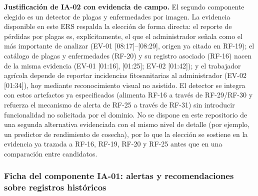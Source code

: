 \documentclass[12pt,a4paper]{article}
\begin{document}
\textbf{Justificación de IA-02 con evidencia de campo.} El segundo componente elegido es un detector de plagas y enfermedades por imagen. La evidencia disponible en este ERS respalda la elección de forma directa: el reporte de pérdidas por plagas es, explícitamente, el que el administrador señala como el más importante de analizar (EV-01 [08:17]--[08:29], origen ya citado en RF-19); el catálogo de plagas y enfermedades (RF-20) y su registro asociado (RF-16) nacen de la misma evidencia (EV-01 [01:16], [01:25]; EV-02 [01:42]); y el trabajador agrícola depende de reportar incidencias fitosanitarias al administrador (EV-02 [01:34]), hoy mediante reconocimiento visual no asistido. El detector se integra con estos artefactos ya especificados (alimenta RF-16 a través de RF-29/RF-30 y refuerza el mecanismo de alerta de RF-25 a través de RF-31) sin introducir funcionalidad no solicitada por el dominio. No se dispone en este repositorio de una segunda alternativa evidenciada con el mismo nivel de detalle (por ejemplo, un predictor de rendimiento de cosecha), por lo que la elección se sostiene en la evidencia ya trazada a RF-16, RF-19, RF-20 y RF-25 antes que en una comparación entre candidatos.

\subsubsection{Ficha del componente IA-01: alertas y recomendaciones sobre registros históricos}
\label{sec:ficha-ia01}
\end{document}
